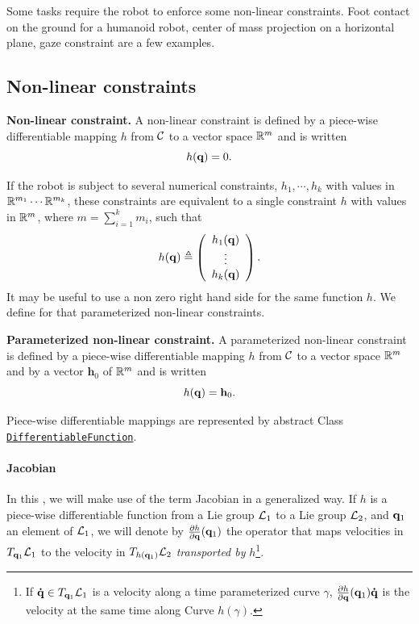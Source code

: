 Some tasks require the robot to enforce some non-linear constraints. Foot contact on the ground for a humanoid robot, center of mass projection on a horizontal plane, gaze constraint are a few examples.

\subsection{Non-linear constraints}

\begin{definition}\textbf{Non-linear constraint.} A non-linear constraint is defined by a {\color{blue} piece-wise} differentiable mapping $h$ from $\mathcal{C}$ to a vector space $\mathbb{R}^m$ and is written
\begin{equation}\label{eq:constraint}
h(\conf) = 0.
\end{equation}
\end{definition}
If the robot is subject to several numerical constraints, $h_1,\cdots,h_k$ with values in $\mathbb{R}^{m_1}\cdots\mathbb{R}^{m_k}$, these constraints are equivalent to a single constraint $h$ with values in $\mathbb{R}^{m}$, where $m=\sum_{i=1}^k m_i$, such that
$$
h(\mathbf{q}) \triangleq \left(\begin{array}{c} h_1(\mathbf{q}) \\ \vdots \\ h_k(\mathbf{q})
\end{array}\right).
$$
It may be useful to use a non zero right hand side for the same function $h$. We define for that parameterized non-linear constraints.
\begin{definition}\textbf{Parameterized non-linear constraint.}
  A parameterized non-linear constraint is defined by a {\color{blue} piece-wise} differentiable mapping $h$ from $\mathcal{C}$ to a vector space $\mathbb{R}^m$ and by a vector $\mathbf{h}_0$ of $\mathbb{R}^m$ and is written
  $$
  h(\mathbf{q}) = \mathbf{h}_0.
  $$
\end{definition}
{\color{blue} Piece-wise} differentiable mappings are represented by abstract Class\\ \href{https://gepettoweb.laas.fr/hpp/hpp-constraints/doxygen-html/classhpp_1_1constraints_1_1DifferentiableFunction.html}{\texttt{DifferentiableFunction}}.

\paragraph{Jacobian}

In this \paper, we will make use of the term Jacobian in a generalized way.
If $h$ is a {\color{blue} piece-wise} differentiable function from a Lie group $\mathcal{L}_1$ to a Lie group $\mathcal{L}_2$, and $\mathbf{q}_1$ an element of $\mathcal{L}_1$, we will denote by $\frac{\partial h}{\partial\mathbf{q}}(\mathbf{q}_1)$ the operator that maps velocities in $T_{\mathbf{q}_1}\mathcal{L}_1$ to the velocity in $T_{h(\mathbf{q}_1)}\mathcal{L}_2$ \textit{transported by} $h$\footnote{If $\mathbf{\dot{q}}\in T_{\mathbf{q}_1}\mathcal{L}_1$ is a velocity along a time parameterized curve $\gamma$, $\frac{\partial h}{\partial\mathbf{q}}(\mathbf{q}_1)\mathbf{\dot{q}}$ is the velocity at
  the same time along Curve $h(\gamma)$.}.

